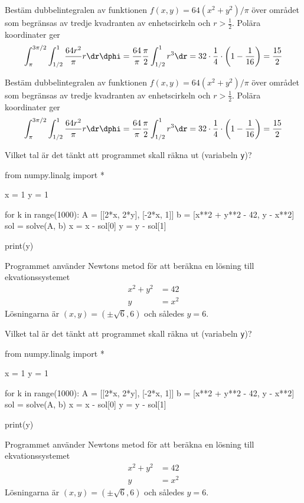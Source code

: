 Bestäm dubbelintegralen av funktionen $f(x, y) = 64(x^2 + y^2)/\pi$ över området
som begränsas av tredje kvadranten av enhets\-cirkeln och $r > \tfrac12$.
Polära koordinater ger
\begin{align*}
  \int_{\pi}^{3\pi/2}\int_{1/2}^1 \frac{64r^2}{\pi} r\dr\dphi
  = \frac{64}{\pi}\frac{\pi}{2} \int_{1/2}^1 r^3\dr
  = 32 \cdot \frac{1}{4} \cdot \left(1 - \frac1{16}\right) = \frac{15}2
\end{align*}
%

Bestäm dubbelintegralen av funktionen $f(x, y) = 64(x^2 + y^2)/\pi$ över området
som begränsas av tredje kvadranten av enhets\-cirkeln och $r > \tfrac12$.
Polära koordinater ger
\begin{align*}
  \int_{\pi}^{3\pi/2}\int_{1/2}^1 \frac{64r^2}{\pi} r\dr\dphi
  = \frac{64}{\pi}\frac{\pi}{2} \int_{1/2}^1 r^3\dr
  = 32 \cdot \frac{1}{4} \cdot \left(1 - \frac1{16}\right) = \frac{15}2
\end{align*}
%

Vilket tal är det tänkt att programmet skall räkna ut (variabeln \texttt{y})? \\
\begin{python}
from numpy.linalg import *

x = 1
y = 1

for k in range(1000):
    A = [[2*x, 2*y], [-2*x, 1]]
    b = [x**2 + y**2 - 42, y - x**2]
    sol = solve(A, b)
    x = x - sol[0]
    y = y - sol[1]

print(y)
\end{python}
Programmet använder Newtons metod för att beräkna en lösning till ekvationssystemet
\begin{align*}
  x^2 + y^2 &= 42 \\
  y &= x^2
\end{align*}
Lösningarna är $(x, y) = (\pm\sqrt{6}, 6)$ och således $y = 6$.
%

Vilket tal är det tänkt att programmet skall räkna ut (variabeln \texttt{y})? \\
\begin{python}
from numpy.linalg import *

x = 1
y = 1

for k in range(1000):
    A = [[2*x, 2*y], [-2*x, 1]]
    b = [x**2 + y**2 - 42, y - x**2]
    sol = solve(A, b)
    x = x - sol[0]
    y = y - sol[1]

print(y)
\end{python}
Programmet använder Newtons metod för att beräkna en lösning till ekvationssystemet
\begin{align*}
  x^2 + y^2 &= 42 \\
  y &= x^2
\end{align*}
Lösningarna är $(x, y) = (\pm\sqrt{6}, 6)$ och således $y = 6$.
%

